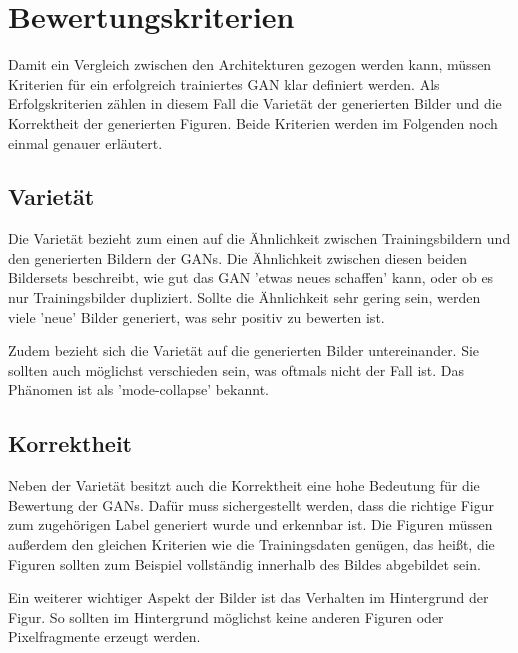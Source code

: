 \section{Bewertungskriterien}
Damit ein Vergleich zwischen den Architekturen gezogen werden kann, müssen Kriterien für ein erfolgreich trainiertes GAN klar definiert werden.
Als Erfolgskriterien zählen in diesem Fall die Varietät der generierten Bilder und die Korrektheit der generierten Figuren.
Beide Kriterien werden im Folgenden noch einmal genauer erläutert.

\subsection{Varietät}
Die Varietät bezieht zum einen auf die Ähnlichkeit zwischen Trainingsbildern und den generierten Bildern der GANs.
Die Ähnlichkeit zwischen diesen beiden Bildersets beschreibt, wie gut das GAN 'etwas neues schaffen' kann, oder ob es nur Trainingsbilder dupliziert.
Sollte die Ähnlichkeit sehr gering sein, werden viele 'neue' Bilder generiert, was sehr positiv zu bewerten ist.
\newline

Zudem bezieht sich die Varietät auf die generierten Bilder untereinander.
Sie sollten auch möglichst verschieden sein, was oftmals nicht der Fall ist.
Das Phänomen ist als 'mode-collapse' bekannt. 

\subsection{Korrektheit}
Neben der Varietät besitzt auch die Korrektheit eine hohe Bedeutung für die Bewertung der GANs.
Dafür muss sichergestellt werden, dass die richtige Figur zum zugehörigen Label generiert wurde und erkennbar ist.
Die Figuren müssen außerdem den gleichen Kriterien wie die Trainingsdaten genügen, das heißt, die Figuren sollten zum Beispiel vollständig innerhalb des Bildes abgebildet sein.
\newline

Ein weiterer wichtiger Aspekt der Bilder ist das Verhalten im Hintergrund der Figur.
So sollten im Hintergrund möglichst keine anderen Figuren oder Pixelfragmente erzeugt werden.

